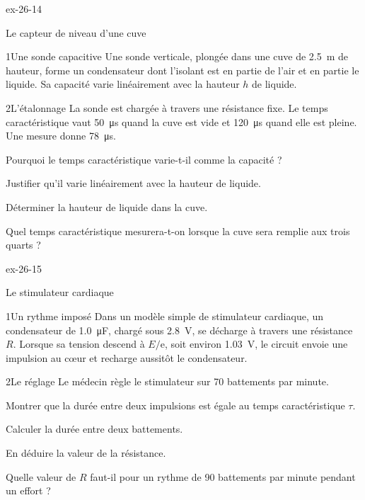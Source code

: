 \begin{blocLivre}{ex-26-14}
\begin{exercice}[3]{Le capteur de niveau d'une cuve}
\begin{docu}{1}{Une sonde capacitive}
Une sonde verticale, plongée dans une cuve de \qty{2,5}{m} de hauteur, forme un condensateur dont l'isolant est en partie de
l'air et en partie le liquide. Sa capacité varie linéairement avec la hauteur $h$ de liquide.
\end{docu}
\begin{docu}{2}{L'étalonnage}
La sonde est chargée à travers une résistance fixe. Le temps caractéristique vaut \qty{50}{\micro s} quand la cuve est vide et
\qty{120}{\micro s} quand elle est pleine. Une mesure donne \qty{78}{\micro s}.
\end{docu}
\begin{questions}
\item Pourquoi le temps caractéristique varie-t-il comme la capacité ?
\item Justifier qu'il varie linéairement avec la hauteur de liquide.
\item \initiative Déterminer la hauteur de liquide dans la cuve.
\item Quel temps caractéristique mesurera-t-on lorsque la cuve sera remplie aux trois quarts ?
\end{questions}
\end{exercice}
\end{blocLivre}
\begin{blocLivre}{ex-26-15}
\begin{exercice}[3]{Le stimulateur cardiaque}
\begin{docu}{1}{Un rythme imposé}
Dans un modèle simple de stimulateur cardiaque, un condensateur de \qty{1,0}{\micro F}, chargé sous \qty{2,8}{V}, se décharge à travers
une résistance $R$. Lorsque sa tension descend à $E/\mathrm{e}$, soit environ \qty{1,03}{V}, le circuit envoie une impulsion au cœur et
recharge aussitôt le condensateur.
\end{docu}
\begin{docu}{2}{Le réglage}
Le médecin règle le stimulateur sur 70 battements par minute.
\end{docu}
\begin{questions}
\item Montrer que la durée entre deux impulsions est égale au temps caractéristique $\tau$.
\item Calculer la durée entre deux battements.
\item \initiative En déduire la valeur de la résistance.
\item Quelle valeur de $R$ faut-il pour un rythme de 90 battements par minute pendant un effort ?
\end{questions}
\end{exercice}
\end{blocLivre}
